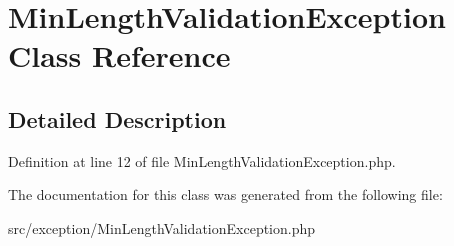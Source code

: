 \hypertarget{classcommon_1_1user_1_1exception_1_1_min_length_validation_exception}{\section{\-Min\-Length\-Validation\-Exception \-Class \-Reference}
\label{classcommon_1_1user_1_1exception_1_1_min_length_validation_exception}
}


\subsection{\-Detailed \-Description}


\-Definition at line 12 of file \-Min\-Length\-Validation\-Exception.\-php.



\-The documentation for this class was generated from the following file\-:\begin{DoxyCompactItemize}
\item 
src/exception/\-Min\-Length\-Validation\-Exception.\-php\end{DoxyCompactItemize}
